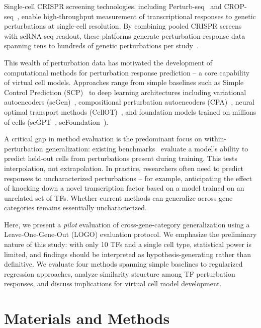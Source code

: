 \documentclass[12pt,number,sort&compress]{elsarticle}
\begin{document}
Single-cell CRISPR screening technologies, including Perturb-seq~\citep{Dixit2016PerturbSeq}
and CROP-seq~\citep{Adamson2016}, enable high-throughput measurement of
transcriptional responses to genetic perturbations at single-cell resolution.
By combining pooled CRISPR screens with scRNA-seq readout, these platforms
generate perturbation-response data spanning tens to hundreds of genetic
perturbations per study~\citep{Norman2019,Replogle2022}.

This wealth of perturbation data has motivated the development of computational
methods for perturbation response prediction -- a core capability of virtual cell
models. Approaches range from simple baselines such as Simple Control Prediction
(SCP)~\citep{Weinreb2018SCP} to deep learning architectures including variational
autoencoders (scGen)~\citep{Lotfollahi2019scGen}, compositional perturbation
autoencoders (CPA)~\citep{Lotfollahi2023CPA}, neural optimal transport methods
(CellOT)~\citep{Zheng2023CellOT}, and foundation models trained on millions of
cells (scGPT~\citep{Cui2024scGPT}, scFoundation~\citep{Hao2024scFoundation}).

A critical gap in method evaluation is the predominant focus on
within-perturbation generalization: existing benchmarks~\citep{Allen2022Benchmark,Crowell2023}
evaluate a model's ability to predict held-out cells from perturbations present
during training. This tests interpolation, not extrapolation. In practice,
researchers often need to predict responses to uncharacterized perturbations --
for example, anticipating the effect of knocking down a novel transcription factor
based on a model trained on an unrelated set of TFs. Whether current methods can
generalize across gene categories remains essentially uncharacterized.

Here, we present a \emph{pilot} evaluation of cross-gene-category generalization
using a Leave-One-Gene-Out (LOGO) evaluation protocol. We emphasize the
preliminary nature of this study: with only 10 TFs and a single cell type,
statistical power is limited, and findings should be interpreted as
hypothesis-generating rather than definitive. We evaluate four methods
spanning simple baselines to regularized regression approaches, analyze
similarity structure among TF perturbation responses, and discuss implications
for virtual cell model development.

\clearpage

\section{Materials and Methods}
\label{sec:methods}
\end{document}

